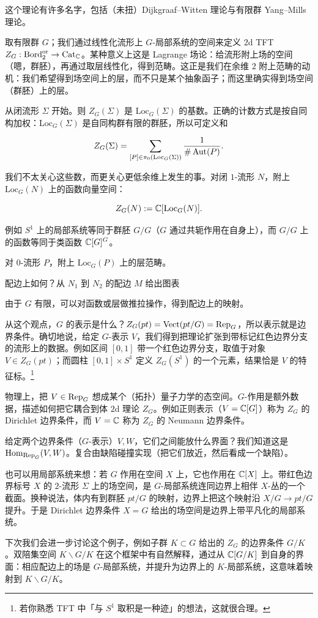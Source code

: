 \begin{example}[有限规范场论]
这个理论有许多名字，包括（未扭）Dijkgraaf–Witten 理论与有限群 Yang–Mills 理论。

取有限群 $G$；我们通过线性化流形上 $G$-局部系统的空间来定义 $2$d TFT $Z_G:\mathrm{Bord}_2^{\mathrm{or}}\to\mathrm{Cat}_{\mathbb{C}}$。某种意义上这是 Lagrange 场论：给流形附上场的空间（嗯，群胚），再通过取层线性化，得到范畴。这正是我们在余维 $2$ 附上范畴的动机：我们希望得到场空间上的层，而不只是某个抽象函子；而这里确实得到场空间（群胚）上的层。

从闭流形 $\Sigma$ 开始。则 $Z_G(\Sigma)$ 是 $\mathrm{Loc}_G(\Sigma)$ 的基数。正确的计数方式是按自同构加权：$\mathrm{Loc}_G(\Sigma)$ 是自同构群有限的群胚，所以可定义和

\[Z_G(\Sigma)=\sum_{[P]\in\pi_0(\mathrm{Loc}_G(\Sigma))}\frac{1}{\#\operatorname{Aut}(P)}.\]

我们不太关心这些数，而更关心更低余维上发生的事。对闭 $1$-流形 $N$，附上 $\mathrm{Loc}_G(N)$ 上的函数向量空间：

\[Z_G(N):=\mathbb{C}[\mathrm{Loc}_G(N)].\]

例如 $S^1$ 上的局部系统等同于群胚 $G/G$（$G$ 通过共轭作用在自身上），而 $G/G$ 上的函数等同于类函数 $\mathbb{C}[G]^G$。

对 $0$-流形 $P$，附上 $\mathrm{Loc}_G(P)$ 上的层范畴。

配边上如何？从 $N_1$ 到 $N_2$ 的配边 $M$ 给出图表


由于 $G$ 有限，可以对函数或层做推拉操作，得到配边上的映射。

从这个观点，$G$ 的表示是什么？$Z_G(pt)=\mathrm{Vect}(pt/G)=\operatorname{Rep}_G$，所以表示就是边界条件。确切地说，给定 $G$-表示 $V$，我们得到把理论扩张到带标记红色边界分支的流形上的数据。例如区间 $[0,1]$ 带一个红色边界分支，取值于对象 $V\in Z_G(pt)$；而圆柱 $[0,1]\times S^1$ 定义 $Z_G(S^1)$ 的一个元素，结果恰是 $V$ 的特征标。\footnote{若你熟悉 TFT 中「与 $S^1$ 取积是一种迹」的想法，这就很合理。}

物理上，把 $V\in\operatorname{Rep}_G$ 想成某个（拓扑）量子力学的态空间。$G$-作用是额外数据，描述如何把它耦合到体 $2$d 理论 $Z_G$。例如正则表示（$V=\mathbb{C}[G]$）称为 $Z_G$ 的 Dirichlet 边界条件，而 $V=\mathbb{C}$ 称为 $Z_G$ 的 Neumann 边界条件。

给定两个边界条件（$G$-表示）$V,W$，它们之间能放什么界面？我们知道这是 $\operatorname{Hom}_{\operatorname{Rep}_G}(V,W)$。复合由缺陷碰撞实现（把它们放近，然后看成一个缺陷）。

也可以用局部系统来想：若 $G$ 作用在空间 $X$ 上，它也作用在 $\mathbb{C}[X]$ 上。带红色边界标号 $X$ 的 $2$-流形 $\Sigma$ 上的场空间，是 $G$-局部系统连同边界上相伴 $X$-丛的一个截面。换种说法，体内有到群胚 $pt/G$ 的映射，边界上把这个映射沿 $X/G\to pt/G$ 提升。于是 Dirichlet 边界条件 $X=G$ 给出的场空间是边界上带平凡化的局部系统。
\end{example}

下次我们会进一步讨论这个例子，例如子群 $K\subset G$ 给出的 $Z_G$ 的边界条件 $G/K$。双陪集空间 $K\backslash G/K$ 在这个框架中有自然解释，通过从 $\mathbb{C}[G/K]$ 到自身的界面：相应配边上的场是 $G$-局部系统，并提升为边界上的 $K$-局部系统，这意味着映射到 $K\backslash G/K$。
